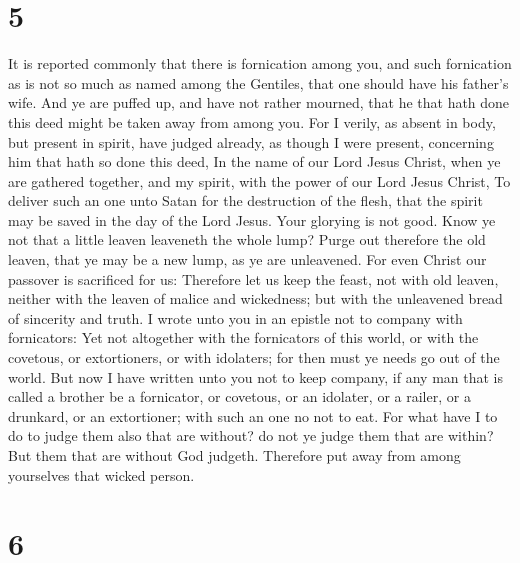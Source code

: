 \hypertarget{section-4}{%
\section{5}\label{section-4}}

 It is reported commonly that there is fornication among
you, and such fornication as is not so much as named among the Gentiles,
that one should have his father's wife.  And ye are puffed
up, and have not rather mourned, that he that hath done this deed might
be taken away from among you.  For I verily, as absent in
body, but present in spirit, have judged already, as though I were
present, concerning him that hath so done this deed,  In
the name of our Lord Jesus Christ, when ye are gathered together, and my
spirit, with the power of our Lord Jesus Christ,  To
deliver such an one unto Satan for the destruction of the flesh, that
the spirit may be saved in the day of the Lord Jesus. 
Your glorying is not good. Know ye not that a little leaven leaveneth
the whole lump?  Purge out therefore the old leaven, that
ye may be a new lump, as ye are unleavened. For even Christ our passover
is sacrificed for us:  Therefore let us keep the feast,
not with old leaven, neither with the leaven of malice and wickedness;
but with the unleavened bread of sincerity and truth.  I
wrote unto you in an epistle not to company with fornicators:
 Yet not altogether with the fornicators of this world,
or with the covetous, or extortioners, or with idolaters; for then must
ye needs go out of the world.  But now I have written
unto you not to keep company, if any man that is called a brother be a
fornicator, or covetous, or an idolater, or a railer, or a drunkard, or
an extortioner; with such an one no not to eat.  For what
have I to do to judge them also that are without? do not ye judge them
that are within?  But them that are without God judgeth.
Therefore put away from among yourselves that wicked person.

\hypertarget{section-5}{%
\section{6}\label{section-5}}

